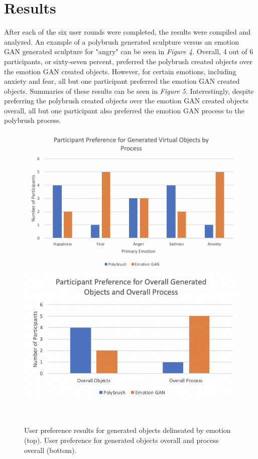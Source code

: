 \documentclass{sigchi}
\begin{document}
\section{Results}

After each of the six user rounds were completed, the results were compiled and analyzed. An example of a polybrush generated sculpture versus an emotion GAN generated sculpture for "angry" can be seen in \emph {Figure 4}. Overall, 4 out of 6 participants, or sixty-seven percent, preferred the polybrush created objects over the emotion GAN created objects. However, for certain emotions, including anxiety and fear, all but one participant preferred the emotion GAN created objects. Summaries of these results can be seen in \emph {Figure 5}. Interestingly, despite preferring the polybrush created objects over the emotion GAN created objects overall, all but one participant also preferred the emotion GAN process to the polybrush process. 

\begin{figure}
  \centering
  \includegraphics[width=2\columnwidth]{figures/emotiongraph}
  \includegraphics[width=2\columnwidth]{figures/overallgraph}
  \caption{User preference results for generated objects delineated by emotion (top). User preference for generated objects overall and process overall (bottom).}~\label{fig:figure5}
\end{figure}
\end{document}

